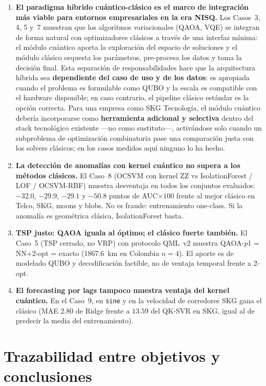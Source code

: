 \begin{enumerate}
\item \textbf{El paradigma híbrido cuántico-clásico es el marco de integración más viable para entornos empresariales en la era NISQ.}
Los Casos~3, 4, 5 y~7 muestran que los algoritmos variacionales (QAOA, VQE) se integran de forma natural con optimizadores clásicos a través de una interfaz mínima: el módulo cuántico aporta la exploración del espacio de soluciones y el módulo clásico orquesta los parámetros, pre-procesa los datos y toma la decisión final. Esta separación de responsabilidades hace que la arquitectura híbrida sea \textbf{dependiente del caso de uso y de los datos}: es apropiada cuando el problema es formulable como QUBO y la escala es compatible con el hardware disponible; en caso contrario, el pipeline clásico estándar es la opción correcta. Para una empresa como SKG Tecnología, el módulo cuántico debería incorporarse como \textbf{herramienta adicional y selectiva} dentro del stack tecnológico existente —no como sustituto—, activándose solo cuando un subproblema de optimización combinatoria pase una comparación justa con los solvers clásicos; en los casos medidos aquí ninguno lo ha hecho.

\item \textbf{La detección de anomalías con kernel cuántico no supera a los métodos clásicos.}
El Caso~8 (OCSVM con kernel ZZ vs IsolationForest / LOF / OCSVM-RBF) muestra desventaja en todos los conjuntos evaluados: $-32.0$, $-29.9$, $-29.1$ y $-50.8$ puntos de AUC$\times100$ frente al mejor clásico en Telco, SKG, moons y blobs. No es fraude: entrenamiento one-class. Si la anomalía es geométrica clásica, IsolationForest basta.

\item \textbf{TSP justo: QAOA iguala al óptimo; el clásico fuerte también.}
El Caso~5 (TSP cerrado, no VRP) con protocolo QML~v2 muestra QAOA-$p$1 = NN+2-opt = exacto (1867.6~km en Colombia $n=4$). El aporte es de modelado QUBO y decodificación factible, no de ventaja temporal frente a 2-opt.

\item \textbf{El forecasting por lags tampoco muestra ventaja del kernel cuántico.}
En el Caso~9, en \texttt{sine} y en la velocidad de corredores SKG gana el clásico (MAE $2.80$ de Ridge frente a $13.59$ del QK-SVR en SKG, igual al de predecir la media del entrenamiento).

\end{enumerate}

\section{Trazabilidad entre objetivos y conclusiones}

